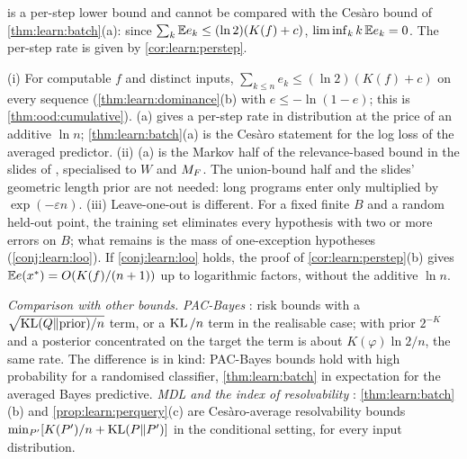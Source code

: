 \begin{remark}\label{rem:learn:cesaro}
 is a per-step lower bound and cannot be compared with the Ces\`aro bound of \cref{thm:learn:batch}(a): since $\sum_k\mathbb{E} e_k\le(\ln2)(K(f)+c)$, $\liminf_kk\,\mathbb{E} e_k=0$. The per-step rate is given by \cref{cor:learn:perstep}.
\end{remark}

\begin{remark}\label{rem:learn:relations}
(i) For computable $f$ and distinct inputs, $\sum_{k\le n}e_k\le(\ln2)(K(f)+c)$ on every sequence (\cref{thm:learn:dominance}(b) with $e\le-\ln(1-e)$; this is \cref{thm:ood:cumulative}). (a) gives a per-step rate in distribution at the price of an additive $\ln n$; \cref{thm:learn:batch}(a) is the Ces\`aro statement for the log loss of the averaged predictor.
(ii) (a) is the Markov half of the relevance-based bound in the slides of \citet[Appendix~A]{vaintrobhanni2026nnbayes}, specialised to $W$ and $M_{F}$. The union-bound half and the slides' geometric length prior are not needed: long programs enter only multiplied by $\exp(-\varepsilon n)$.
(iii) Leave-one-out is different. For a fixed finite $B$ and a random held-out point, the training set eliminates every hypothesis with two or more errors on $B$; what remains is the mass of one-exception hypotheses (\cref{conj:learn:loo}). If \cref{conj:learn:loo} holds, the proof of \cref{cor:learn:perstep}(b) gives $\mathbb{E} e(x^*)=O(K(f)/(n+1))$ up to logarithmic factors, without the additive $\ln n$.
\end{remark}

\emph{Comparison with other bounds.} \emph{PAC-Bayes} \citep{mcallester1999some}: risk bounds with a $\sqrt{\operatorname{KL}(Q\|\text{prior})/n}$ term, or a $\operatorname{KL}/n$ term in the realisable case; with prior $2^{-K}$ and a posterior concentrated on the target the term is about $K(\varphi)\ln2/n$, the same rate. The difference is in kind: PAC-Bayes bounds hold with high probability for a randomised classifier, \cref{thm:learn:batch} in expectation for the averaged Bayes predictive. \emph{MDL and the index of resolvability} \citep{barron1991minimum}: \cref{thm:learn:batch}(b) and \cref{prop:learn:perquery}(c) are Ces\`aro-average resolvability bounds $\min_{P'}[K(P')/n+\operatorname{KL}(P\|P')]$ in the conditional setting, for every input distribution.

